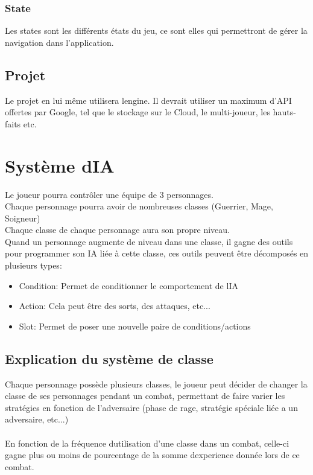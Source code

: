 \documentclass[16pt, oneside]{report}
\begin{document}
\subsection{State}
Les states sont les diff\'erents \'etats du jeu, ce sont elles qui permettront de g\'erer la navigation dans l'application.

\section{Projet}
Le projet en lui m\^eme utilisera l\textquotesingle engine. Il devrait utiliser un maximum d'API offertes par Google, tel que le stockage sur le Cloud, le multi-joueur, les hauts-faits etc.

\chapter{Syst\`eme d\textquotesingle IA}
Le joueur pourra contr\^oler une \'equipe de 3 personnages.\\
Chaque personnage pourra avoir de nombreuses classes (Guerrier, Mage, Soigneur)\\
Chaque classe de chaque personnage aura son propre niveau.\\
Quand un personnage augmente de niveau dans une classe, il gagne des outils pour programmer son IA li\'ee \`a cette classe, ces outils peuvent \^etre d\'ecompos\'es en plusieurs types:
\begin{itemize}
	\item Condition: Permet de conditionner le comportement de l\textquotesingle IA
	\item Action: Cela peut \^etre des sorts, des attaques, etc...
	\item Slot: Permet de poser une nouvelle paire de conditions/actions
\end{itemize}

\section{Explication du syst\`eme de classe}
Chaque personnage poss\`ede plusieurs classes, le joueur peut d\'ecider de changer la classe de ses personnages pendant un combat, permettant de faire varier les strat\'egies en fonction de l'adversaire (phase de rage, strat\'egie sp\'eciale li\'ee a un adversaire, etc...)\\\\
En fonction de la fr\'equence d\textquotesingle utilisation d'une classe dans un combat, celle-ci gagne plus ou moins de pourcentage de la somme d\textquotesingle experience donn\'ee lors de ce combat.
\end{document}
